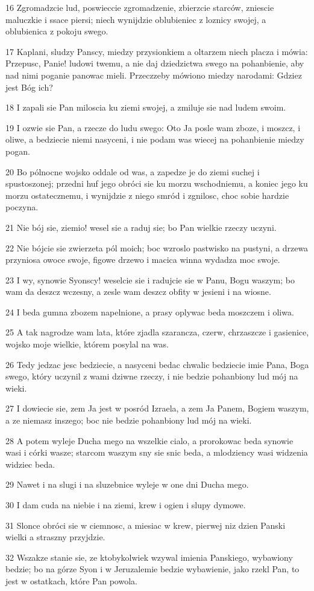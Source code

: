 \par 16 Zgromadzcie lud, poswieccie zgromadzenie, zbierzcie starców, zniescie maluczkie i ssace piersi; niech wynijdzie oblubieniec z loznicy swojej, a oblubienica z pokoju swego.
\par 17 Kaplani, sludzy Panscy, miedzy przysionkiem a oltarzem niech placza i mówia: Przepusc, Panie! ludowi twemu, a nie daj dziedzictwa swego na pohanbienie, aby nad nimi poganie panowac mieli. Przeczzeby mówiono miedzy narodami: Gdziez jest Bóg ich?
\par 18 I zapali sie Pan miloscia ku ziemi swojej, a zmiluje sie nad ludem swoim.
\par 19 I ozwie sie Pan, a rzecze do ludu swego: Oto Ja posle wam zboze, i moszcz, i oliwe, a bedziecie niemi nasyceni, i nie podam was wiecej na pohanbienie miedzy pogan.
\par 20 Bo pólnocne wojsko oddale od was, a zapedze je do ziemi suchej i spustoszonej; przedni huf jego obróci sie ku morzu wschodniemu, a koniec jego ku morzu ostatecznemu, i wynijdzie z niego smród i zgnilosc, choc sobie hardzie poczyna.
\par 21 Nie bój sie, ziemio! wesel sie a raduj sie; bo Pan wielkie rzeczy uczyni.
\par 22 Nie bójcie sie zwierzeta pól moich; boc wzroslo pastwisko na pustyni, a drzewa przyniosa owoce swoje, figowe drzewo i macica winna wydadza moc swoje.
\par 23 I wy, synowie Syonscy! weselcie sie i radujcie sie w Panu, Bogu waszym; bo wam da deszcz wczesny, a zesle wam deszcz obfity w jesieni i na wiosne.
\par 24 I beda gumna zbozem napelnione, a prasy oplywac beda moszczem i oliwa.
\par 25 A tak nagrodze wam lata, które zjadla szarancza, czerw, chrzaszcze i gasienice, wojsko moje wielkie, którem posylal na was.
\par 26 Tedy jedzac jesc bedziecie, a nasyceni bedac chwalic bedziecie imie Pana, Boga swego, który uczynil z wami dziwne rzeczy, i nie bedzie pohanbiony lud mój na wieki.
\par 27 I dowiecie sie, zem Ja jest w posród Izraela, a zem Ja Panem, Bogiem waszym, a ze niemasz inszego; boc nie bedzie pohanbiony lud mój na wieki.
\par 28 A potem wyleje Ducha mego na wszelkie cialo, a prorokowac beda synowie wasi i córki wasze; starcom waszym sny sie snic beda, a mlodziency wasi widzenia widziec beda.
\par 29 Nawet i na slugi i na sluzebnice wyleje w one dni Ducha mego.
\par 30 I dam cuda na niebie i na ziemi, krew i ogien i slupy dymowe.
\par 31 Slonce obróci sie w ciemnosc, a miesiac w krew, pierwej niz dzien Panski wielki a straszny przyjdzie.
\par 32 Wszakze stanie sie, ze ktobykolwiek wzywal imienia Panskiego, wybawiony bedzie; bo na górze Syon i w Jeruzalemie bedzie wybawienie, jako rzekl Pan, to jest w ostatkach, które Pan powola.

